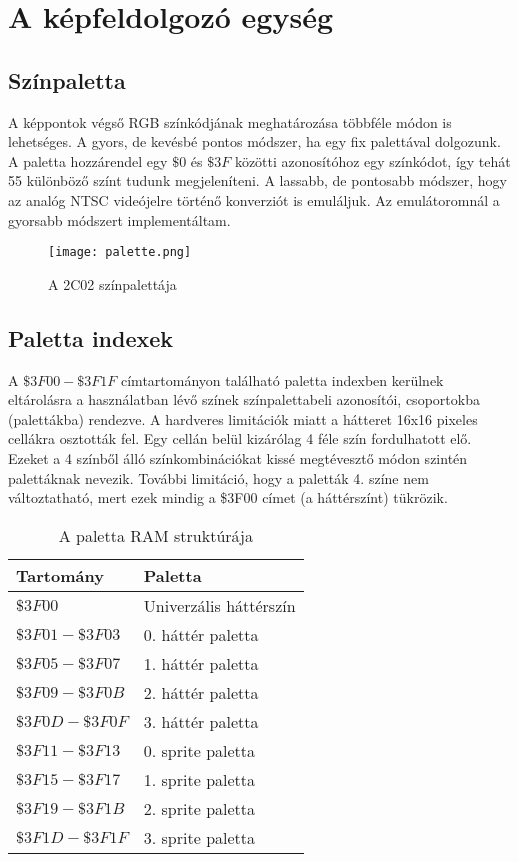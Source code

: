 \section{A képfeldolgozó egység}

\subsection{Színpaletta}

A képpontok végső RGB színkódjának meghatározása többféle módon is lehetséges. A gyors, de kevésbé pontos módszer, ha egy fix palettával dolgozunk. A paletta hozzárendel egy $\$0$ és $\$3F$ közötti azonosítóhoz egy színkódot, így tehát 55 különböző színt tudunk megjeleníteni. A lassabb, de pontosabb módszer, hogy az analóg NTSC videójelre történő konverziót is emuláljuk. Az emulátoromnál a gyorsabb módszert implementáltam.

\vspace{0.3cm}
\begin{figure}[H]
	\centering
	\texttt{[image: palette.png]}
	\caption{A 2C02 színpalettája}
\end{figure}

\clearpage

\subsection{Paletta indexek}

A $\$3F00 - \$3F1F$ címtartományon található paletta indexben kerülnek eltárolásra a használatban lévő színek színpalettabeli azonosítói, csoportokba (palettákba) rendezve. A hardveres limitációk miatt a hátteret 16x16 pixeles cellákra osztották fel. Egy cellán belül kizárólag 4 féle szín fordulhatott elő. Ezeket a 4 színből álló színkombinációkat kissé megtévesztő módon szintén palettáknak nevezik. További limitáció, hogy a paletták 4. színe nem változtatható, mert ezek mindig a \$3F00 címet (a háttérszínt) tükrözik.

\begin{table}[H]
	\centering
	\begin{tabular}{ | l | l | }
		\hline
		Tartomány & Paletta \\
		\hline			
		$ \$3F00 $ & Univerzális háttérszín \\
		$ \$3F01 - \$3F03 $ & 0. háttér paletta \\
		$ \$3F05 - \$3F07 $ & 1. háttér paletta \\
		$ \$3F09 - \$3F0B $ & 2. háttér paletta \\
		$ \$3F0D - \$3F0F $ & 3. háttér paletta \\
		$ \$3F11 - \$3F13 $ & 0. sprite paletta \\
		$ \$3F15 - \$3F17 $ & 1. sprite paletta \\
		$ \$3F19 - \$3F1B $ & 2. sprite paletta \\
		$ \$3F1D - \$3F1F $ & 3. sprite paletta \\
		\hline
	\end{tabular}
	\caption{A paletta RAM struktúrája}
	\label{fig:paletteram}
\end{table}

